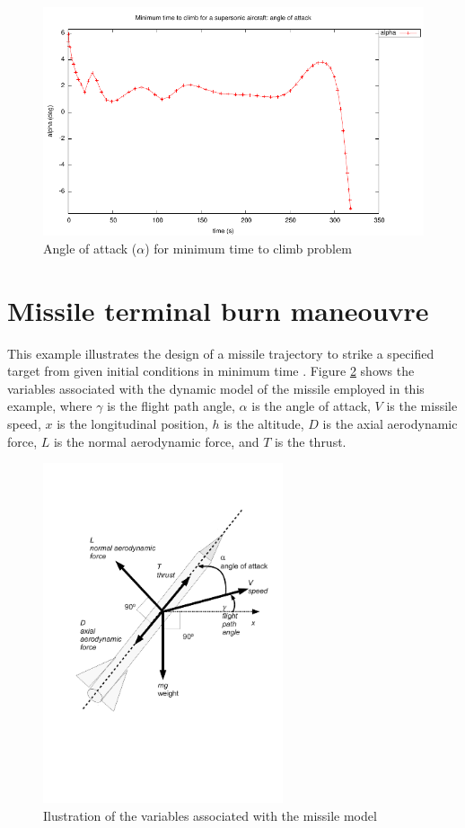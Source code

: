 \documentclass[a4paper,11pt]{report}    %
\begin{document}
\begin{figure}
  \centering
  \includegraphics{../examples/climb/alpha.pdf}
  \caption{Angle of attack ($\alpha$) for minimum time to climb problem}
  \label{climb_alpha}
\end{figure}



\section{Missile terminal burn maneouvre }


This example illustrates the design of a missile trajectory to strike a specified target from given initial 
conditions in minimum time \cite{Subchan:09}. Figure \ref{fig:missile} shows the variables associated with 
the dynamic model of the missile employed in this example, where $\gamma$ is the flight path angle, $\alpha$ 
is the angle of attack, $V$ is the missile speed, $x$ is the longitudinal position,  $h$ is the altitude, 
$D$ is the axial aerodynamic force, $L$ is the normal aerodynamic force, and $T$ is the thrust.
 
\begin{figure}[htbp] \label{fig:missile}
 \centerline{\includegraphics[height=10cm]{../examples/missile/missile}}
\caption{Ilustration of the variables associated with the missile model}
\end{figure}
\end{document}
